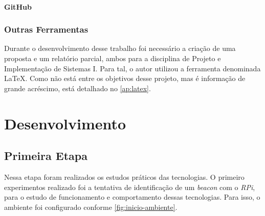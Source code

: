 \documentclass[
		12pt,				%
		openright,			%
		oneside,			%
		a4paper,			%
		chapter=TITLE,		%
		english,			%
		brazil				%
	]{abntex2}
\begin{document}
\subsubsection{GitHub}\label{sec:github}



\subsection{Outras Ferramentas}\label{sec:outras-ferramentas}

Durante o desenvolvimento desse trabalho foi necessário a criação de uma proposta e um relatório parcial, ambos para a disciplina de Projeto e Implementação de Sistemas I. Para tal, o autor utilizou a ferramenta denominada LaTeX. Como não está entre os objetivos desse projeto, mas é informação de grande acréscimo, está detalhado no \autoref{ap:latex}.




\chapter{Desenvolvimento}\label{cap:desenvolvimento}

\section{Primeira Etapa}\label{sec:primeira-etapa}

Nessa etapa foram realizados os estudos práticos das tecnologias. O primeiro experimentos realizado foi a tentativa de identificação de um \textit{beacon} com o \textit{RPi}, para o estudo de funcionamento e comportamento dessas tecnologias. Para isso, o ambiente foi configurado conforme \autoref{fig:inicio-ambiente}. 
\end{document}
